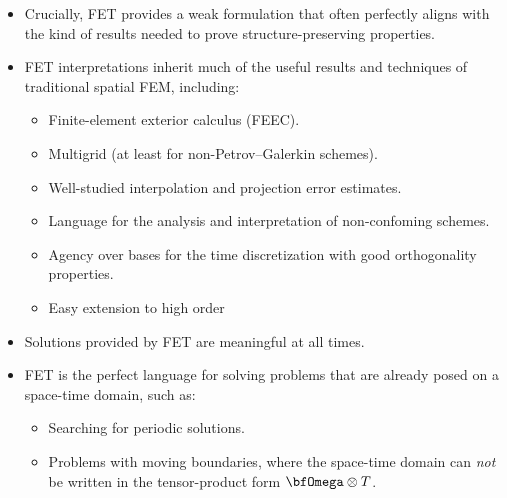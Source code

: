     \begin{itemize}
        \item  Crucially, FET provides a weak formulation that often perfectly aligns with the kind of results needed to prove structure-preserving properties.
        \item  FET interpretations inherit much of the useful results and techniques of traditional spatial FEM, including:
        \begin{itemize}
            \item  Finite-element exterior calculus (FEEC).
            \item  Multigrid (at least for non-Petrov–Galerkin schemes).
            \item  Well-studied interpolation and projection error estimates.
            \item  Language for the analysis and interpretation of non-confoming schemes.
            \item  Agency over bases for the time discretization with good orthogonality properties. 
            \item  Easy extension to high order
        \end{itemize}
        \item  Solutions provided by FET are meaningful at all times. 
        \item  FET is the perfect language for solving problems that are already posed on a space-time domain, such as:
        \begin{itemize}
            \item  Searching for periodic solutions. 
            \item  Problems with moving boundaries, where the space-time domain can \emph{not} be written in the tensor-product form $\bfOmega\otimes T$.
        \end{itemize}
    \end{itemize}
    \line

